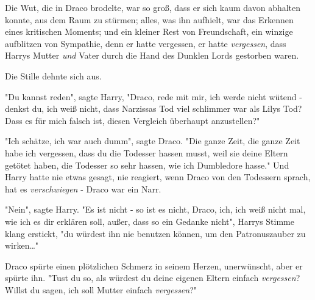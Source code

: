 {Die Wut, die in Draco brodelte, war so groß, dass er sich kaum davon abhalten konnte, aus dem Raum zu stürmen; alles, was ihn aufhielt, war das Erkennen eines kritischen Moments; und ein kleiner Rest von Freundschaft, ein winzige aufblitzen von Sympathie, denn er hatte vergessen, er hatte \emph{vergessen}, dass Harrys Mutter \emph{und} Vater durch die Hand des Dunklen Lords gestorben waren.

Die Stille dehnte sich aus.

"Du kannst reden", sagte Harry, "Draco, rede mit mir, ich werde nicht wütend - denkst du, ich weiß nicht, dass Narzissas Tod viel schlimmer war als Lilys Tod? Dass es für mich falsch ist, diesen Vergleich überhaupt anzustellen?"

"Ich schätze, ich war auch dumm", sagte Draco. "Die ganze Zeit, die ganze Zeit habe ich vergessen, dass du die Todesser hassen musst, weil sie deine Eltern getötet haben, die Todesser so sehr hassen, wie ich Dumbledore hasse." Und Harry hatte nie etwas gesagt, nie reagiert, wenn Draco von den Todessern sprach, hat es \emph{verschwiegen} - Draco war ein Narr.

"Nein", sagte Harry. "Es ist nicht - so ist es nicht, Draco, ich, ich weiß nicht mal, wie ich es dir erklären soll, außer, dass so ein Gedanke nicht", Harrys Stimme klang erstickt, "du würdest ihn nie benutzen können, um den Patronuszauber zu wirken…"

Draco spürte einen plötzlichen Schmerz in seinem Herzen, unerwünscht, aber er spürte ihn. "Tust du so, als würdest du deine eigenen Eltern einfach \emph{vergessen}? Willst du sagen, ich soll Mutter einfach \emph{vergessen}?"

}
